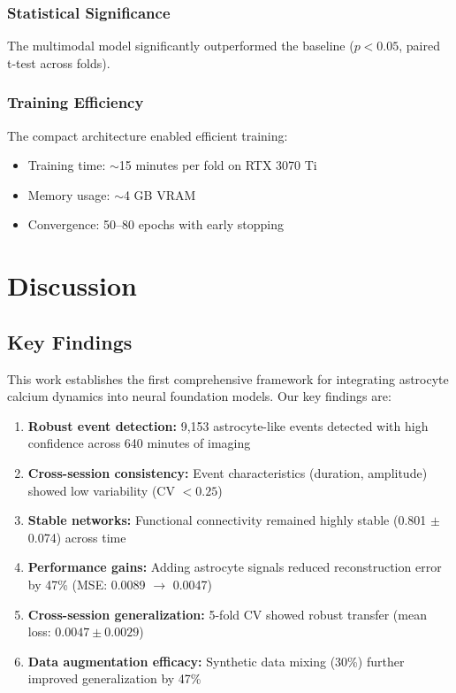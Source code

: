 \documentclass[11pt,twocolumn]{article}
\begin{document}
\subsubsection{Statistical Significance}
The multimodal model significantly outperformed the baseline ($p < 0.05$, paired t-test across folds).

\subsubsection{Training Efficiency}
The compact architecture enabled efficient training:
\begin{itemize}
    \item Training time: $\sim$15 minutes per fold on RTX 3070 Ti
    \item Memory usage: $\sim$4 GB VRAM
    \item Convergence: 50--80 epochs with early stopping
\end{itemize}

\section{Discussion}

\subsection{Key Findings}

This work establishes the first comprehensive framework for integrating astrocyte calcium dynamics into neural foundation models. Our key findings are:

\begin{enumerate}
    \item \textbf{Robust event detection:} 9,153 astrocyte-like events detected with high confidence across 640 minutes of imaging
    \item \textbf{Cross-session consistency:} Event characteristics (duration, amplitude) showed low variability (CV $< 0.25$)
    \item \textbf{Stable networks:} Functional connectivity remained highly stable (0.801 $\pm$ 0.074) across time
    \item \textbf{Performance gains:} Adding astrocyte signals reduced reconstruction error by 47\% (MSE: 0.0089 $\rightarrow$ 0.0047)
    \item \textbf{Cross-session generalization:} 5-fold CV showed robust transfer (mean loss: $0.0047 \pm 0.0029$)
    \item \textbf{Data augmentation efficacy:} Synthetic data mixing (30\%) further improved generalization by 47\%
\end{enumerate}
\end{document}
